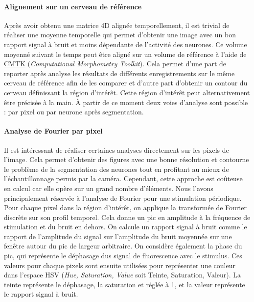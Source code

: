 \paragraph{Alignement sur un cerveau de référence}

Après avoir obtenu une matrice 4D alignée temporellement, il est trivial de réaliser une moyenne temporelle qui permet d'obtenir une image avec un bon rapport signal à bruit et moins dépendante de l'activité des neurones. Ce volume moyenné suivant le temps peut être aligné sur un volume de référence à l'aide de \href{https://www.nitrc.org/projects/cmtk}{CMTK} (\emph{Computational Morphometry Toolkit}). Cela permet d'une part de reporter après analyse les résultats de différents enregistrements sur le même cerveau de référence afin de les comparer et d'autre part d'obtenir un contour du cerveau définissant la région d'intérêt. Cette région d'intérêt peut alternativement être précisée à la main. À partir de ce moment deux voies d'analyse sont possible : par pixel ou par neurone après segmentation.

\paragraph{Analyse de Fourier par pixel}


Il est intéressant de réaliser certaines analyses directement sur les pixels de l'image. Cela permet d'obtenir des figures avec une bonne résolution et contourne le problème de la segmentation des neurones tout en profitant au mieux de l'échantillonnage permis par la caméra. Cependant, cette approche est coûteuse en calcul car elle opère sur un grand nombre d'éléments. Nous l'avons principalement réservée à l'analyse de Fourier pour une stimulation périodique.
Pour chaque pixel dans la région d'intérêt, on applique la transformée de Fourier discrète sur son profil temporel. Cela donne un pic en amplitude à la fréquence de stimulation et du bruit en dehors. On calcule un rapport signal à bruit comme le rapport de l'amplitude du signal sur l'amplitude du bruit moyennée sur une fenêtre autour du pic de largeur arbitraire. On considère également la phase du pic, qui représente le déphasage dus signal de fluorescence avec le stimulus.
Ces valeurs pour chaque pixels sont ensuite utilisées pour représenter une couleur dans l'espace HSV (\emph{Hue, Saturation, Value} soit Teinte, Saturation, Valeur). La teinte représente le déphasage, la saturation et réglée à 1, et la valeur représente le rapport signal à bruit. 

